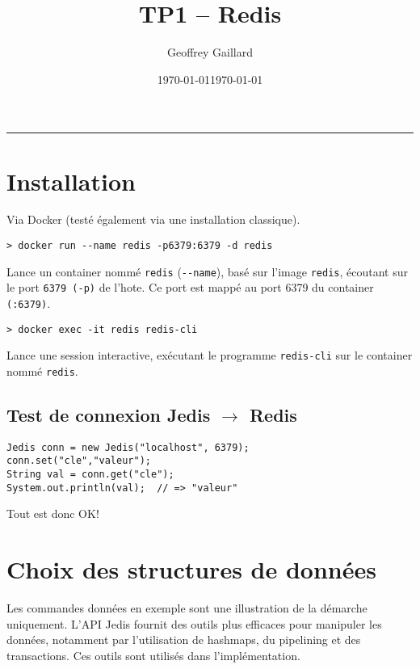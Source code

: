 \documentclass[article,a4paper,12pt]{article}
\author{Geoffrey Gaillard}
\date{\today}
\title{}
\begin{document}
\setcounter{tocdepth}{3}

\title{TP1 -- Redis}
\date{\today}

\maketitle{}

\rule{\linewidth}{0.5pt}



\section{Installation}
\label{sec:orgheadline2}

Via Docker (testé également via une installation classique).


\begin{verbatim}
> docker run --name redis -p6379:6379 -d redis
\end{verbatim}

Lance un container nommé \texttt{redis} (\texttt{-{}-name}), basé sur l'image \texttt{redis},
écoutant sur le port \texttt{6379 (-p)} de l'hote. Ce port est mappé au port 6379 du
container \texttt{(:6379)}.

\begin{verbatim}
> docker exec -it redis redis-cli
\end{verbatim}

Lance une session interactive, exécutant le programme \texttt{redis-cli} sur le
container nommé \texttt{redis}.


\subsection{Test de connexion Jedis \(\rightarrow\) Redis}
\label{sec:orgheadline1}

\begin{verbatim}
Jedis conn = new Jedis("localhost", 6379);
conn.set("cle","valeur");
String val = conn.get("cle");
System.out.println(val);  // => "valeur"
\end{verbatim}
Tout est donc OK!


\section{Choix des structures de données}
\label{sec:orgheadline12}

Les commandes données en exemple sont une illustration de la démarche
uniquement. L'API Jedis fournit des outils plus efficaces pour manipuler les
données, notamment par l'utilisation de hashmaps, du pipelining et des
transactions. Ces outils sont utilisés dans l'implémentation.
\end{document}
